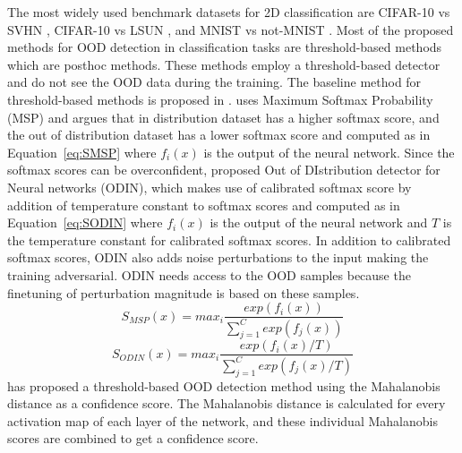     The most widely used benchmark datasets for 2D classification are CIFAR-10 vs SVHN \cite{liang2017enhancing_ODIN}, CIFAR-10 vs LSUN \cite{hendrycks2016baseline_MSP}, and MNIST vs not-MNIST \cite{hendrycks2016baseline_MSP}. 
    Most of the proposed methods for OOD detection in classification tasks are threshold-based methods which are posthoc methods.
    These methods employ a threshold-based detector and do not see the OOD data during the training.
    The baseline method for threshold-based methods is proposed in \cite{hendrycks2016baseline_MSP}.
    \cite{hendrycks2016baseline_MSP} uses Maximum Softmax Probability (MSP) and argues that in distribution dataset has a higher softmax score, and the out of distribution dataset has a lower softmax score and computed as in Equation~\ref{eq:SMSP} where $f_i(x)$ is the output of the neural network.
    Since the softmax scores can be overconfident, \cite{liang2017enhancing_ODIN} proposed Out of DIstribution detector for Neural networks (ODIN), which makes use of calibrated softmax score by addition of temperature constant to softmax scores and computed as in Equation~\ref{eq:SODIN} where $f_i(x)$ is the output of the neural network and $T$ is the temperature constant for calibrated softmax scores.
    In addition to calibrated softmax scores, ODIN also adds noise perturbations to the input making the training adversarial.
    ODIN needs access to the OOD samples because the finetuning of perturbation magnitude is based on these samples.
    \begin{equation}
        S_{MSP}(x) = max_i \frac{exp(f_i(x))}{\sum^{C}_{j=1}exp(f_j(x))}  \label{eq:SMSP}
    \end{equation}
    \begin{equation}
        S_{ODIN}(x) = max_i \frac{exp(f_i(x)/T)}{\sum^{C}_{j=1}exp(f_j(x)/T)}  \label{eq:SODIN}
    \end{equation}
    \cite{lee2018simple_mahalanobis} has proposed a threshold-based OOD detection method using the Mahalanobis distance as a confidence score.
    The Mahalanobis distance is calculated for every activation map of each layer of the network, and these individual Mahalanobis scores are combined to get a confidence score.
